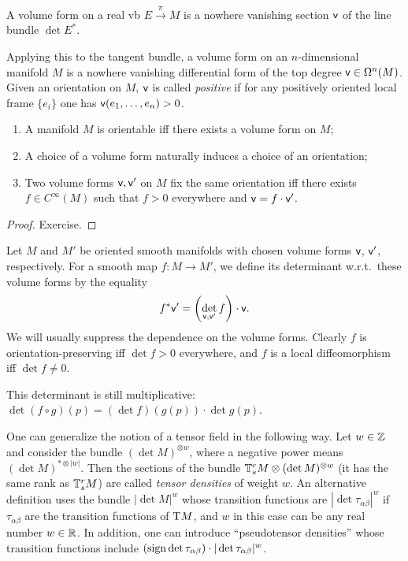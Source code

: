 \begin{defn}
    A volume form on a real \gls{vb} $E\overset{\pi}{\to} M$ is a nowhere vanishing section $\mathsf{v}$ of the line bundle $\det E^\ast$. 

    Applying this to the tangent bundle, a volume form on an $n$-dimensional manifold $M$ is a nowhere vanishing differential form of the top degree $\mathsf{v}\in \Omega^n(M)$. Given an orientation on $M$, $\mathsf{v}$ is called \emph{positive} if for any positively oriented local frame $\{e_i\}$ one has $\mathsf{v}(e_1,\ldots,e_n)>0$.
\end{defn}

\begin{prop}
\begin{enumerate}
    \item A manifold $M$ is orientable iff there exists a volume form on $M$;
    \item A choice of a volume form naturally induces a choice of an orientation;
    \item Two volume forms $\mathsf{v},\mathsf{v}'$ on $M$ fix the same orientation iff there exists $f\in C^\infty(M)$ such that $f>0$ everywhere and $\mathsf{v}=f\cdot \mathsf{v}'$. 
\end{enumerate}
\end{prop}
\begin{proof}
Exercise.
\end{proof}


\begin{defn}
    Let $M$ and $M'$ be oriented smooth manifolds with chosen volume forms $\mathsf{v}$, $\mathsf{v}'$, respectively. For a smooth map $f:M\to M'$, we define its determinant w.r.t.\ these volume forms by the equality
    \[f^\ast \mathsf{v}'=\left(\det_{\mathsf{v},\mathsf{v}'}f\right)\cdot \mathsf{v}.\]
    We will usually suppress the dependence on the volume forms. Clearly $f$ is orientation-preserving iff $\det f>0$ everywhere, and $f$ is a local diffeomorphism iff $\det f\neq 0$.

    This determinant is still multiplicative: $\det(f\circ g)(p)=(\det f)(g(p))\cdot \det g(p)$.
\end{defn}

\begin{defn}\label{def tensor densities}
    One can generalize the notion of a tensor field in the following way. Let $w\in\mathbb{Z}$ and consider the bundle $(\det M)^{\otimes w}$, where a negative power means $(\det M)^{\ast\otimes |w|}$. Then the sections of the bundle $\mathbb{T}^r_s M\otimes (\det M)^{\otimes w}$ (it has the same rank as $\mathbb{T}^r_s M$) are called \emph{tensor densities} of weight $w$. An alternative definition uses the bundle $\left|\det M\right|^{w}$ whose transition functions are $|\det\tau_{\alpha\beta}|^w$ if $\tau_{\alpha\beta}$ are the transition functions of $\mathrm{T} M$, and $w$ in this case can be any real number $w\in\mathbb{R} $. In addition, one can introduce ``pseudotensor densities'' whose transition functions include $(\operatorname{sign}\det\tau_{\alpha\beta})\cdot |\det\tau_{\alpha\beta}|^w$.
\end{defn}


